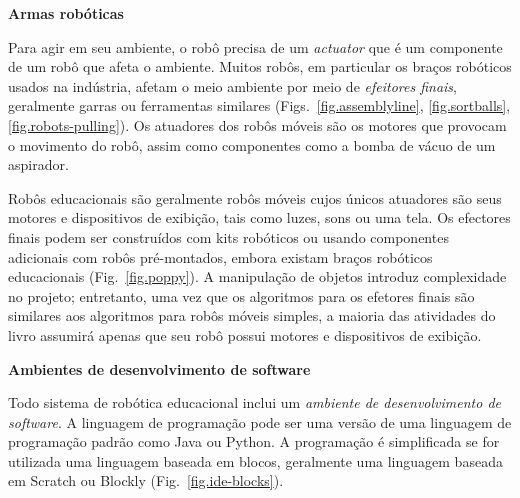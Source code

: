 
\medskip

\noindent\textbf{Armas robóticas}

Para agir em seu ambiente, o robô precisa de um \emph{actuator} que é um componente de um robô que afeta o ambiente. Muitos robôs, em particular os braços robóticos usados na indústria, afetam o meio ambiente por meio de \emph{efeitores finais}, geralmente garras ou ferramentas similares (Figs.~\ref{fig.assemblyline}, \ref{fig.sortballs}, \ref{fig.robots-pulling}). Os atuadores dos robôs móveis são os motores que provocam o movimento do robô, assim como componentes como a bomba de vácuo de um aspirador.

Robôs educacionais são geralmente robôs móveis cujos únicos atuadores são seus motores e dispositivos de exibição, tais como luzes, sons ou uma tela. Os efectores finais podem ser construídos com kits robóticos ou usando componentes adicionais com robôs pré-montados, embora existam braços robóticos educacionais (Fig.~\ref{fig.poppy}). A manipulação de objetos introduz complexidade no projeto; entretanto, uma vez que os algoritmos para os efetores finais são similares aos algoritmos para robôs móveis simples, a maioria das atividades do livro assumirá apenas que seu robô possui motores e dispositivos de exibição.

\medskip

\noindent\textbf{Ambientes de desenvolvimento de software}

Todo sistema de robótica educacional inclui um \emph{ambiente de desenvolvimento de software}. A linguagem de programação pode ser uma versão de uma linguagem de programação padrão como Java ou Python. A programação é simplificada se for utilizada uma linguagem baseada em blocos, geralmente uma linguagem baseada em Scratch ou Blockly (Fig.~\ref{fig.ide-blocks}).

